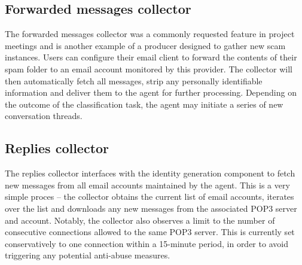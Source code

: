 \subsection{Forwarded messages collector}
The forwarded messages collector was a commonly requested feature in project meetings and is another example of a producer designed to gather new scam instances. Users can configure their email client to forward the contents of their spam folder to an email account monitored by this provider. The collector will then automatically fetch all messages, strip any personally identifiable information and deliver them to the agent for further processing. Depending on the outcome of the classification task, the agent may initiate a series of new conversation threads.

\subsection{Replies collector}
The replies collector interfaces with the identity generation component to fetch new messages from all email accounts maintained by the agent. This is a very simple proces -- the collector obtains the current list of email accounts, iterates over the list and downloads any new messages from the associated POP3 server and account.  Notably, the collector also observes a limit to the number of consecutive connections allowed to the same POP3 server. This is currently set conservatively to one connection within a 15-minute period, in order to avoid triggering any potential anti-abuse measures.